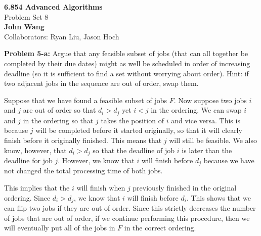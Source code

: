 \documentclass[psamsfonts]{amsart}
\newenvironment{sol}{\vspace{0.25cm}{\large \bfseries Solution:}}{\qedsymbol}
\newenvironment{prob}[1]{\begin{framed}{\large \bfseries Problem #1:}}{\end{framed}}
\newcommand{\makenewtitle}{
    \begin{center}
    {\huge \bfseries 6.854 Advanced Algorithms} \\
    Problem Set 8\\
    \vspace{0.25cm}
    {\bfseries John Wang} \\
    Collaborators: Ryan Liu, Jason Hoch 
    \end{center}
    \vspace{0.5cm}
}
\begin{document}
\newpage
\makenewtitle

\begin{prob}{5-a}
Argue that any feasible subset of jobs (that can all together be completed by their due dates) might as well be scheduled in order of increasing deadline (so it is sufficient to find a set without worrying about order). Hint: if two adjacent jobs in the sequence are out of order, swap them. 
\end{prob}
\begin{sol}
Suppose that we have found a feasible subset of jobs $F$. Now suppose two jobs $i$ and $j$ are out of order so that $d_i > d_j$ yet $i < j$ in the ordering. We can swap $i$ and $j$ in the ordering so that $j$ takes the position of $i$ and vice versa. This is because $j$ will be completed before it started originally, so that it will clearly finish before it originally finished. This means that $j$ will still be feasible. We also know, however, that $d_i > d_j$ so that the deadline of job $i$ is later than the deadline for job $j$. However, we know that $i$ will finish before $d_j$ because we have not changed the total processing time of both jobs. 

This implies that the $i$ will finish when $j$ previously finished in the original ordering. Since $d_i > d_j$, we know that $i$ will finish before $d_i$. This shows that we can flip two jobs if they are out of order. Since this strictly decreases the number of jobs that are out of order, if we continue performing this procedure, then we will eventually put all of the jobs in $F$ in the correct ordering. 
\end{sol}
\end{document}
